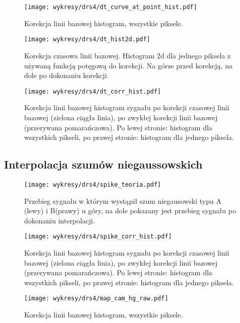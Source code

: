 \documentclass[a4paper,11pt,twoside]{article}
\begin{document}
\begin{figure}[H] 
\centering
\texttt{[image: wykresy/drs4/dt\_curve\_at\_point\_hist.pdf]}
\caption{Korekcja linii bazowej histogram, wszystkie piksele.}
\label{fig:dt_curve_fit_few_pixels}
\end{figure}

\begin{figure}[H] 
\centering
\texttt{[image: wykresy/drs4/dt\_hist2d.pdf]}
\caption{Korekcja czasowa linii bazowej. Histogram 2d dla jednego piksela z używaną funkcją potęgową do korekcji. Na górze przed korekcją, na dole po dokonaniu korekcji.}
\label{fig:baseline_corr_hist}
\end{figure}

\begin{figure}[H] 
\centering
\texttt{[image: wykresy/drs4/dt\_corr\_hist.pdf]}
\caption{Korekcja linii bazowej histogram sygnału po korekcji czasowej linii bazowej (zielona ciągła linia), po zwykłej korekcji linii bazowej (przerywana pomarańczowa). Po lewej stronie: histogram dla wszystkich pikseli, po prawej stronie: histogram dla jednego piksela.}
\label{fig:baseline_corr_hist}
\end{figure}

\subsection{Interpolacja szumów niegaussowskich}
\begin{figure}[H] 
\centering
\texttt{[image: wykresy/drs4/spike\_teoria.pdf]}
\caption{Przebieg sygnału w którym wystąpił szum niegausowski typu A (lewy) i B(prawy) u góry, na dole pokazany jest przebieg sygnału po dokonaniu interpolacji.}
\label{fig:spike_corr}
\end{figure}

\begin{figure}[H] 
\centering
\texttt{[image: wykresy/drs4/spike\_corr\_hist.pdf]}
\caption{Korekcja linii bazowej histogram sygnału po korekcji czasowej linii bazowej (zielona ciągła linia), po zwykłej korekcji linii bazowej (przerywana pomarańczowa). Po lewej stronie: histogram dla wszystkich pikseli, po prawej stronie: histogram dla jednego piksela.}
\label{fig:baseline_corr_hist}
\end{figure}

\begin{figure}[H] 
\centering
\texttt{[image: wykresy/drs4/map\_cam\_hg\_raw.pdf]}
\caption{Korekcja linii bazowej histogram, wszystkie piksele.}
\label{fig:dt_curve_fit_few_pixels}
\end{figure}
\end{document}
